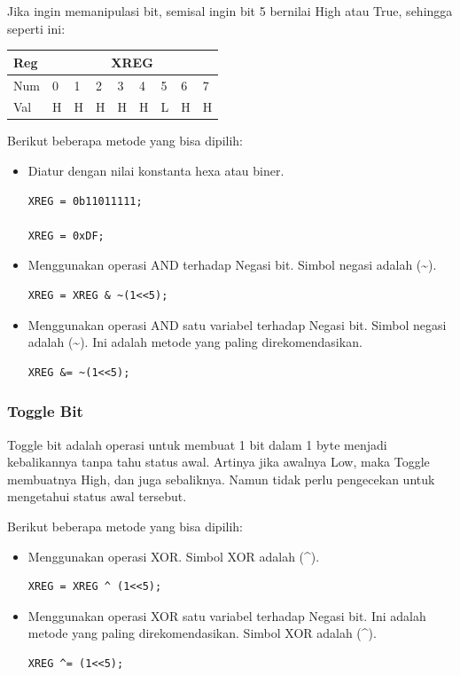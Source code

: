 \documentclass[12pt,]{article}
\begin{document}
	Jika ingin memanipulasi bit, semisal ingin bit 5 bernilai High atau True, sehingga seperti ini:
	\begin{table}[H]
		\begin{tabular}{|l|l|l|l|l|l|l|l|l|}
			\hline
			Reg & \multicolumn{8}{c|}{XREG}     \\ \hline
			Num & 0 & 1 & 2 & 3 & 4 & 5 & 6 & 7 \\ \hline
			Val & H & H & H & H & H & L & H & H \\ \hline
		\end{tabular}
	\end{table}
	
	Berikut beberapa metode yang bisa dipilih:
	\begin{itemize}
		\item Diatur dengan nilai konstanta hexa atau biner.
		\begin{verbatim}
XREG = 0b11011111;
		
XREG = 0xDF;
		\end{verbatim}
		
		\item Menggunakan operasi AND terhadap Negasi bit.
		Simbol negasi adalah (\textasciitilde).
		\begin{verbatim}
XREG = XREG & ~(1<<5);
		\end{verbatim}
		
		\item Menggunakan operasi AND satu variabel terhadap Negasi bit.
		Simbol negasi adalah (\textasciitilde).
		Ini adalah metode yang paling direkomendasikan.
		\begin{verbatim}
XREG &= ~(1<<5);
		\end{verbatim}
	\end{itemize}

	\subsubsection{Toggle Bit}
	
	Toggle bit adalah operasi untuk membuat 1 bit dalam 1 byte menjadi kebalikannya tanpa tahu status awal.
	Artinya jika awalnya Low, maka Toggle membuatnya High, dan juga sebaliknya.
	Namun tidak perlu pengecekan untuk mengetahui status awal tersebut.
	
	Berikut beberapa metode yang bisa dipilih:
	\begin{itemize}
		
		\item Menggunakan operasi XOR.
		Simbol XOR adalah (\^{}).
		\begin{verbatim}
XREG = XREG ^ (1<<5);
		\end{verbatim}
		
		\item Menggunakan operasi XOR satu variabel terhadap Negasi bit.
		Ini adalah metode yang paling direkomendasikan.
		Simbol XOR adalah (\^{}).
		\begin{verbatim}
XREG ^= (1<<5);
		\end{verbatim}
	\end{itemize}
\end{document}
